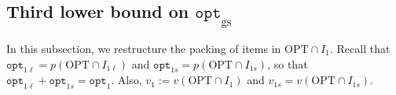 \documentclass[10pt,a4paper]{amsart}
\newcommand{\AM}{\mathcal{A}}
\newtheorem{lemma}[theorem]{Lemma}
\theoremstyle{definition}
\newcommand{\opt}{\mathtt{opt}}
\newcommand{\optgs}{\mathtt{opt}_{\mathrm{gs}}}
\newcommand{\optonel}{\mathtt{opt}_{1\ell}}
\newcommand{\optones}{\mathtt{opt}_{1s}}
\newcommand{\honel}{h_{1\ell}}
\newcommand{\vones}{v_{1s}}
\begin{document}
\subsection{Third lower bound on \texorpdfstring{$\optgs$}{optgs}}
\label{sec:thirdlb}



In this subsection, we restructure the packing of items in $\text{OPT}\cap I_1$. Recall that $\optonel = p(\text{OPT}\cap I_{1\ell})$ and $\optones = p(\text{OPT}\cap I_{1s})$, so that $\optonel+\optones = \opt_1$. Also, $v_1 := v(\text{OPT}\cap I_1)$ and $\vones = v(\text{OPT}\cap I_{1s})$. 








\end{document}
